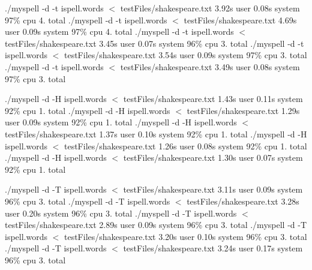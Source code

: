 ./myspell -\/d -\/t ispell.\-words $<$ test\-Files/shakespeare.\-txt 3.\-92s user 0.\-08s system 97\% cpu 4. total ./myspell -\/d -\/t ispell.\-words $<$ test\-Files/shakespeare.\-txt 4.\-69s user 0.\-09s system 97\% cpu 4. total ./myspell -\/d -\/t ispell.\-words $<$ test\-Files/shakespeare.\-txt 3.\-45s user 0.\-07s system 96\% cpu 3. total ./myspell -\/d -\/t ispell.\-words $<$ test\-Files/shakespeare.\-txt 3.\-54s user 0.\-09s system 97\% cpu 3. total ./myspell -\/d -\/t ispell.\-words $<$ test\-Files/shakespeare.\-txt 3.\-49s user 0.\-08s system 97\% cpu 3. total

./myspell -\/d -\/\-H ispell.\-words $<$ test\-Files/shakespeare.\-txt 1.\-43s user 0.\-11s system 92\% cpu 1. total ./myspell -\/d -\/\-H ispell.\-words $<$ test\-Files/shakespeare.\-txt 1.\-29s user 0.\-09s system 92\% cpu 1. total ./myspell -\/d -\/\-H ispell.\-words $<$ test\-Files/shakespeare.\-txt 1.\-37s user 0.\-10s system 92\% cpu 1. total ./myspell -\/d -\/\-H ispell.\-words $<$ test\-Files/shakespeare.\-txt 1.\-26s user 0.\-08s system 92\% cpu 1. total ./myspell -\/d -\/\-H ispell.\-words $<$ test\-Files/shakespeare.\-txt 1.\-30s user 0.\-07s system 92\% cpu 1. total

./myspell -\/d -\/\-T ispell.\-words $<$ test\-Files/shakespeare.\-txt 3.\-11s user 0.\-09s system 96\% cpu 3. total ./myspell -\/d -\/\-T ispell.\-words $<$ test\-Files/shakespeare.\-txt 3.\-28s user 0.\-20s system 96\% cpu 3. total ./myspell -\/d -\/\-T ispell.\-words $<$ test\-Files/shakespeare.\-txt 2.\-89s user 0.\-09s system 96\% cpu 3. total ./myspell -\/d -\/\-T ispell.\-words $<$ test\-Files/shakespeare.\-txt 3.\-20s user 0.\-10s system 96\% cpu 3. total ./myspell -\/d -\/\-T ispell.\-words $<$ test\-Files/shakespeare.\-txt 3.\-24s user 0.\-17s system 96\% cpu 3. total 
